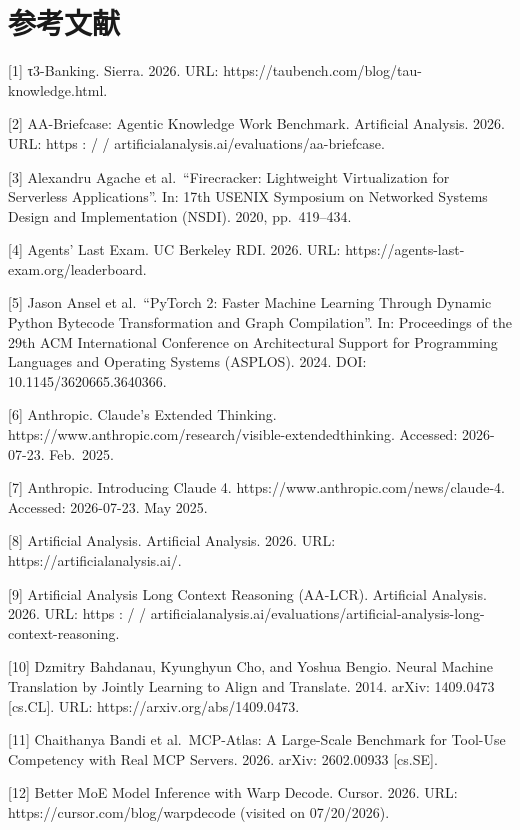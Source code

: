 \section*{参考文献}\label{references}

{[}1{]} τ3-Banking. Sierra. 2026. URL:
https://taubench.com/blog/tau-knowledge.html.

{[}2{]} AA-Briefcase: Agentic Knowledge Work Benchmark. Artificial
Analysis. 2026. URL: https : / /
artificialanalysis.ai/evaluations/aa-briefcase.

{[}3{]} Alexandru Agache et al.~``Firecracker: Lightweight
Virtualization for Serverless Applications''. In: 17th USENIX Symposium
on Networked Systems Design and Implementation (NSDI). 2020,
pp.~419--434.

{[}4{]} Agents' Last Exam. UC Berkeley RDI. 2026. URL:
https://agents-last-exam.org/leaderboard.

{[}5{]} Jason Ansel et al.~``PyTorch 2: Faster Machine Learning Through
Dynamic Python Bytecode Transformation and Graph Compilation''. In:
Proceedings of the 29th ACM International Conference on Architectural
Support for Programming Languages and Operating Systems (ASPLOS). 2024.
DOI: 10.1145/3620665.3640366.

{[}6{]} Anthropic. Claude's Extended Thinking.
https://www.anthropic.com/research/visible-extendedthinking. Accessed:
2026-07-23. Feb.~2025.

{[}7{]} Anthropic. Introducing Claude 4.
https://www.anthropic.com/news/claude-4. Accessed: 2026-07-23. May 2025.

{[}8{]} Artificial Analysis. Artificial Analysis. 2026. URL:
https://artificialanalysis.ai/.

{[}9{]} Artificial Analysis Long Context Reasoning (AA-LCR). Artificial
Analysis. 2026. URL: https : / /
artificialanalysis.ai/evaluations/artificial-analysis-long-context-reasoning.

{[}10{]} Dzmitry Bahdanau, Kyunghyun Cho, and Yoshua Bengio. Neural
Machine Translation by Jointly Learning to Align and Translate. 2014.
arXiv: 1409.0473 {[}cs.CL{]}. URL: https://arxiv.org/abs/1409.0473.

{[}11{]} Chaithanya Bandi et al.~MCP-Atlas: A Large-Scale Benchmark for
Tool-Use Competency with Real MCP Servers. 2026. arXiv: 2602.00933
{[}cs.SE{]}.

{[}12{]} Better MoE Model Inference with Warp Decode. Cursor. 2026. URL:
https://cursor.com/blog/warpdecode (visited on 07/20/2026).


